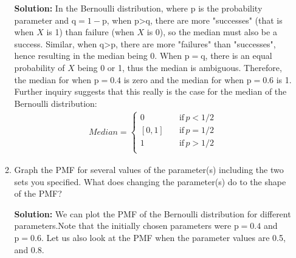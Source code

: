 \documentclass{article}\usepackage[]{graphicx}\usepackage[]{color}
\begin{document}
\begin{enumerate}
\begin{enumerate}
	\textbf{Solution:} In the Bernoulli distribution, where p is the probability parameter and $\mathrm{q = 1 - p}$, when p\textgreater q, there are more "successes" (that is when $X$ is 1) than failure (when $X$ is 0), so the median must also be a success. Similar, when q\textgreater p, there are more "failures" than "successes", hence resulting in the median being 0. When $\mathrm{p = q}$, there is an equal probability of $X$ being 0 or 1, thus the median is ambiguous. Therefore, the median for when $\mathrm{p = 0.4}$ is zero and the median for when $\mathrm{p = 0.6}$ is 1. Further inquiry \citep{BernoulliWiki} suggests that this really is the case for the median of the Bernoulli distribution:\
	\begin{align*}
	Median=\begin{cases}
          0 \quad &\text{if} \, p < 1/2\\
          [0,1] \quad &\text{if} \, p = 1/2\\
          1 \quad &\text{if} \, p > 1/2\\
     \end{cases}
	\end{align*}
	\item \label{q3PMF} Graph the PMF for several values of the parameter(s) 
	including the two sets you specified. What does changing the parameter(s) do 
	to the shape of the PMF?
	
	\textbf{Solution:} We can plot the PMF of the Bernoulli distribution for different parameters.Note that the initially chosen parameters were $\mathrm{p =0.4}$ and $\mathrm{p=0.6}$. Let us also look at the PMF when the parameter values are 0.5, and 0.8.
	

\end{enumerate}
\end{enumerate}
\end{document}
